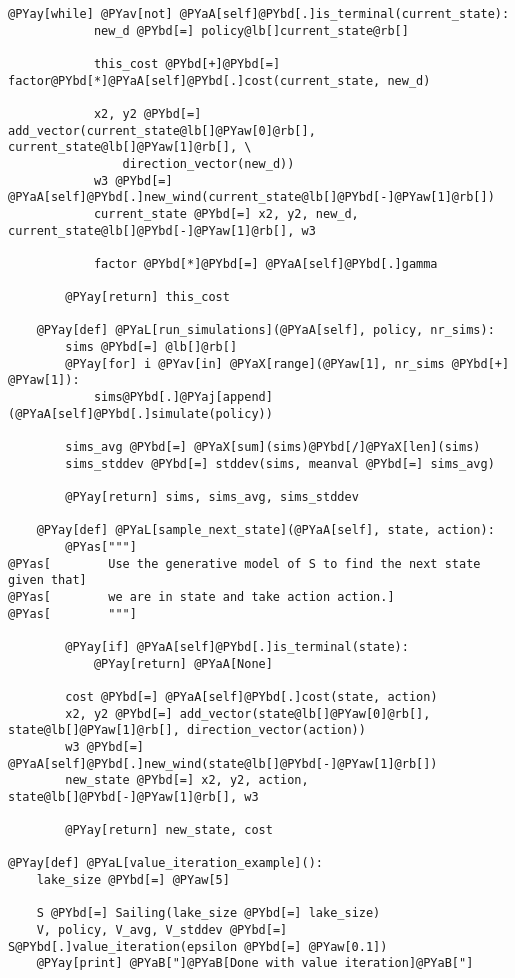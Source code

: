 \begin{Verbatim}[commandchars=@\[\]]
        @PYay[while] @PYav[not] @PYaA[self]@PYbd[.]is_terminal(current_state):
            new_d @PYbd[=] policy@lb[]current_state@rb[]

            this_cost @PYbd[+]@PYbd[=] factor@PYbd[*]@PYaA[self]@PYbd[.]cost(current_state, new_d)

            x2, y2 @PYbd[=] add_vector(current_state@lb[]@PYaw[0]@rb[], current_state@lb[]@PYaw[1]@rb[], \
                direction_vector(new_d))
            w3 @PYbd[=] @PYaA[self]@PYbd[.]new_wind(current_state@lb[]@PYbd[-]@PYaw[1]@rb[])
            current_state @PYbd[=] x2, y2, new_d, current_state@lb[]@PYbd[-]@PYaw[1]@rb[], w3

            factor @PYbd[*]@PYbd[=] @PYaA[self]@PYbd[.]gamma

        @PYay[return] this_cost

    @PYay[def] @PYaL[run_simulations](@PYaA[self], policy, nr_sims):
        sims @PYbd[=] @lb[]@rb[]
        @PYay[for] i @PYav[in] @PYaX[range](@PYaw[1], nr_sims @PYbd[+] @PYaw[1]):
            sims@PYbd[.]@PYaj[append](@PYaA[self]@PYbd[.]simulate(policy))

        sims_avg @PYbd[=] @PYaX[sum](sims)@PYbd[/]@PYaX[len](sims)
        sims_stddev @PYbd[=] stddev(sims, meanval @PYbd[=] sims_avg)

        @PYay[return] sims, sims_avg, sims_stddev

    @PYay[def] @PYaL[sample_next_state](@PYaA[self], state, action):
        @PYas["""]
@PYas[        Use the generative model of S to find the next state given that]
@PYas[        we are in state and take action action.]
@PYas[        """]

        @PYay[if] @PYaA[self]@PYbd[.]is_terminal(state): 
            @PYay[return] @PYaA[None]

        cost @PYbd[=] @PYaA[self]@PYbd[.]cost(state, action)
        x2, y2 @PYbd[=] add_vector(state@lb[]@PYaw[0]@rb[], state@lb[]@PYaw[1]@rb[], direction_vector(action))
        w3 @PYbd[=] @PYaA[self]@PYbd[.]new_wind(state@lb[]@PYbd[-]@PYaw[1]@rb[])
        new_state @PYbd[=] x2, y2, action, state@lb[]@PYbd[-]@PYaw[1]@rb[], w3

        @PYay[return] new_state, cost

@PYay[def] @PYaL[value_iteration_example]():
    lake_size @PYbd[=] @PYaw[5]

    S @PYbd[=] Sailing(lake_size @PYbd[=] lake_size) 
    V, policy, V_avg, V_stddev @PYbd[=] S@PYbd[.]value_iteration(epsilon @PYbd[=] @PYaw[0.1])
    @PYay[print] @PYaB["]@PYaB[Done with value iteration]@PYaB["]


\end{Verbatim}
